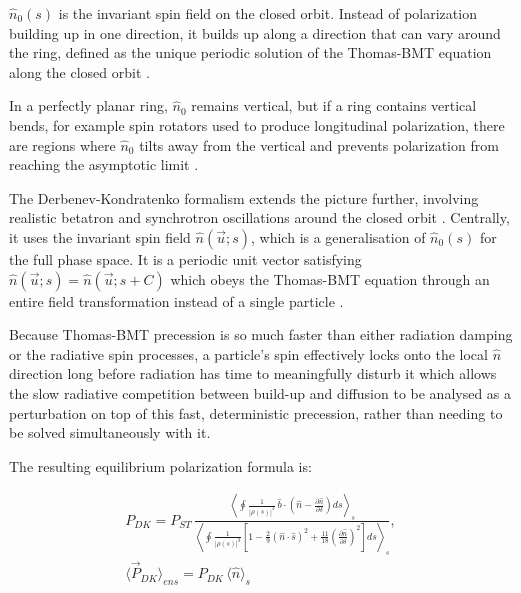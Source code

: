 \documentclass[%
 aip,
 amsmath,amssymb,
 reprint,%
superscriptaddress
]{revtex4-2}
\begin{document}
$\hat{n}_0 (s)$ is the invariant spin field on the closed orbit. Instead of polarization building up in one direction, it builds up along a direction that can vary around the ring, defined as the unique periodic solution of the Thomas-BMT equation along the closed orbit \cite{baier_katkov_strakhovenko_1970}.

In a perfectly planar ring, $\hat{n}_0$ remains vertical, but if a ring contains vertical bends, for example spin rotators used to produce longitudinal polarization, there are regions where $\hat{n}_0$ tilts away from the vertical and prevents polarization from reaching the asymptotic limit \cite{zara_berglund_2001}.

The Derbenev-Kondratenko formalism extends the picture further, involving realistic betatron and synchrotron oscillations around the closed orbit \cite{derbenev_kondratenko_1973}. Centrally, it uses the invariant spin field $\hat{n}(\vec{u};s)$, which is a generalisation of $\hat{n}_0 (s)$ for the full phase space. It is a periodic unit vector satisfying $\hat{n} (\vec{u};s)=\hat{n} (\vec{u};s+C)$ which obeys the Thomas-BMT equation through an entire field transformation instead of a single particle \cite{zara_berglund_2001}.

Because Thomas-BMT precession is so much faster than either radiation damping or the radiative spin processes, a particle's spin effectively locks onto the local $\hat{n}$ direction long before radiation has time to meaningfully disturb it which allows the slow radiative competition between build-up and diffusion to be analysed as a perturbation on top of this fast, deterministic precession, rather than needing to be solved simultaneously with it. \cite{hamwi_hoffstaetter_2025}

The resulting equilibrium polarization formula is:

\begin{equation}
  \begin{gathered}
  P_{DK} = P_{ST}\,\frac{\displaystyle\left\langle\oint\frac{1}{|\rho(s)|^3}\,\hat{b}\cdot\left(\hat{n}-\frac{\partial\hat{n}}{\partial\delta}\right)ds\right\rangle_s}{\displaystyle\left\langle\oint\frac{1}{|\rho(s)|^3}\left[1-\frac{2}{9}(\hat{n}\cdot\hat{s})^2+\frac{11}{18}\left(\frac{\partial\hat{n}}{\partial\delta}\right)^2\right]ds\right\rangle_s}, \\[2ex]
  \langle\vec{P}_{DK}\rangle_{ens} = P_{DK}\,\langle\hat{n}\rangle_s
  \end{gathered}
\end{equation}
\end{document}
